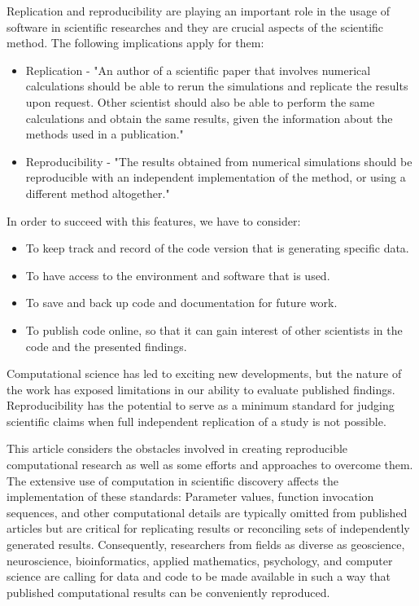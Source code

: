 Replication and reproducibility are playing an important role in the usage of software in scientific researches and they are crucial aspects of the scientific method. The following implications apply for them:

\begin{itemize}
\item Replication - "An author of a scientific paper that involves numerical calculations should be able to
rerun the simulations and replicate the results upon request. Other scientist should also be able to
perform the same calculations and obtain the same results, given the information about the methods
used in a publication."\cite{johansson2014introduction}
\item Reproducibility - "The results obtained from numerical simulations should be reproducible with an
independent implementation of the method, or using a different method altogether."\cite{johansson2014introduction}
\end{itemize}

In order to succeed with this features, we have to consider:

\begin{itemize}
\item To keep track and record of the code version that is generating specific data.
\item To have access to the environment and software that is used.
\item To save and back up code and documentation for future work.
\item To publish code online, so that it can gain interest of other scientists in the code and the presented findings. \cite{johansson2014introduction}
\end{itemize}

Computational science has led to exciting new developments, but the nature of the work has exposed limitations in our ability to evaluate published findings. Reproducibility has the potential to serve as a minimum standard for judging scientific claims when full independent replication of a study is not possible. \cite{peng2011reproducible}

This article considers the obstacles involved in creating reproducible computational research as well as some efforts and approaches to overcome them.\cite{levequereproducible} The
extensive use of computation in scientific discovery
affects the implementation of these standards:
Parameter values, function invocation sequences,
and other computational details are typically
omitted from published articles but are critical
for replicating results or reconciling sets of
independently generated results. Consequently,
researchers from fields as diverse as geoscience,
neuroscience, bioinformatics, applied mathematics,
psychology, and computer science are calling
for data and code to be made available in such a
way that published computational results can be
conveniently reproduced.

